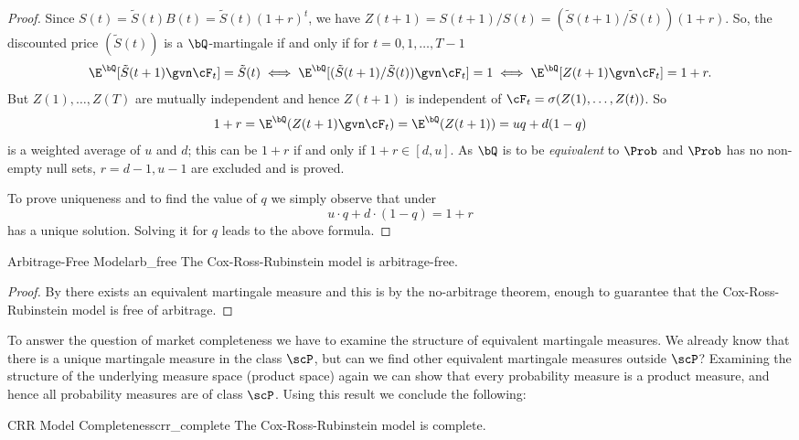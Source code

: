 \begin{proof}
	Since $S(t) = \tilde{S}(t)B(t) = \tilde{S}(t)(1+r)^t$, we have $Z(t+1) = S(t+1)/S(t) = (\tilde{S}(t+1)/\tilde{S}(t))(1+r)$. So, the discounted price $(\tilde{S}(t))$ is a $\bQ$-martingale if and only if for $t = 0, 1, \dots, T-1$
	\[
		\E^{\bQ}[\tilde{S}(t+1) \gvn \cF_t] = \tilde{S}(t) \iff \E^{\bQ}[(\tilde{S}(t+1)/\tilde{S}(t)) \gvn \cF_t] = 1 \iff \E^{\bQ}[Z(t+1) \gvn \cF_t] = 1+r.
	\]
	But $Z(1), \dots, Z(T)$ are mutually independent and hence $Z(t+1)$ is independent of $\cF_t = \sigma(Z(1), \dots, Z(t))$. So
	\[
		1+r = \E^{\bQ}(Z(t+1) \gvn \cF_t) = \E^{\bQ}(Z(t+1)) = uq + d(1-q)
	\]
	is a weighted average of $u$ and $d$; this can be $1+r$ if and only if $1+r \in [d, u]$. As $\bQ$ is to be \textit{equivalent} to $\Prob$ and $\Prob$ has no non-empty null sets, $r=d-1, u-1$ are excluded and  is proved.

	To prove uniqueness and to find the value of $q$ we simply observe that under 
	\[
		u \cdot q + d \cdot (1-q) = 1+r
	\]
	has a unique solution. Solving it for $q$ leads to the above formula.
\end{proof}

\begin{cor}{Arbitrage-Free Model}{arb_free}
	The Cox-Ross-Rubinstein model is arbitrage-free.
\end{cor}

\begin{proof}
	By  there exists an equivalent martingale measure and this is by the no-arbitrage theorem,  enough to guarantee that the Cox-Ross-Rubinstein model is free of arbitrage.
\end{proof}

To answer the question of market completeness we have to examine the structure of equivalent martingale measures. We already know that there is a unique martingale measure in the class $\scP$, but can we find other equivalent martingale measures outside $\scP$? Examining the structure of the underlying measure space (product space) again we can show that every probability measure is a product measure, and hence all probability measures are of class $\scP$. Using this result we conclude the following:

\begin{prop}{CRR Model Completeness}{crr_complete}
	The Cox-Ross-Rubinstein model is complete.
\end{prop}

